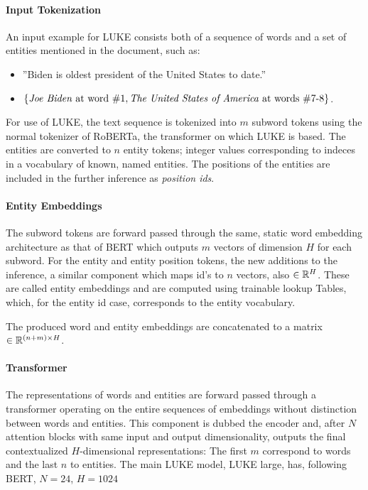 \documentclass[main.tex]{subfiles}
\begin{document}
\paragraph{Input Tokenization}
An input example for LUKE consists both of a sequence of words and a set of entities mentioned in the document, such as:
\begin{itemize}
    \item ''Biden is oldest president of the United States to date.''
    \item $\{\text{\emph{Joe Biden} at word \#1}, \text{\emph{The United States of America} at words \#7-8}\}$.
\end{itemize}
For use of LUKE, the text sequence is tokenized into $m$ subword tokens using the normal tokenizer of RoBERTa, the transformer on which LUKE is based.
The entities are converted to $n$ entity tokens; integer values corresponding to indeces in a vocabulary of known, named entities.
The positions of the entities are included in the further inference as \emph{position ids}.

\paragraph{Entity Embeddings}
The subword tokens are forward passed through the same, static word embedding architecture as that of BERT which outputs $m$ vectors of dimension $H$ for each subword.
For the entity and entity position tokens, the new additions to the inference, a similar component which maps id's to $n$ vectors, also $\in \mathbb R^H$.
These are called entity embeddings and are computed using trainable lookup Tables, which, for the entity id case, corresponds to the entity vocabulary.

The produced word and entity embeddings are concatenated to a matrix $\in \mathbb R^{(n+m)\times H}$.

\paragraph{Transformer}
The representations of words and entities are forward passed through a transformer operating on the entire sequences of embeddings without distinction between words and entities.
This component is dubbed the encoder and, after $N$ attention blocks with same input and output dimensionality, outputs the final contextualized $H$-dimensional representations:
The first $m$ correspond to words and the last $n$ to entities.
The main LUKE model, LUKE large, has, following BERT, $N=24$, $H=1024$
\end{document}
